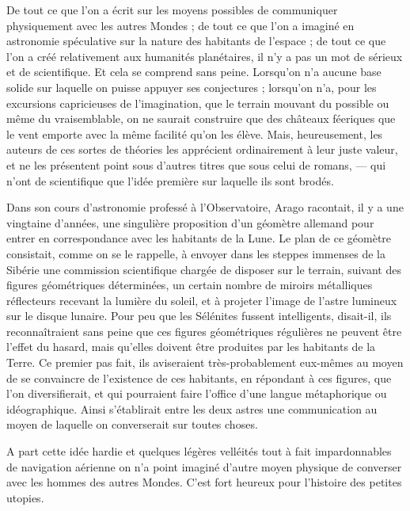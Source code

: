 \documentclass[a4paper, 11pt, oneside]{article}
\begin{document}
De tout ce que l'on a écrit sur les moyens possibles de communiquer physiquement avec les autres Mondes ; de tout ce que l'on a imaginé en astronomie spéculative sur la nature des habitants de l'espace ; de tout ce que l'on a créé relativement aux humanités planétaires, il n'y a pas un mot de sérieux et de scientifique. Et cela se comprend sans peine. Lorsqu'on n'a aucune base solide sur laquelle on puisse appuyer ses conjectures ; lorsqu'on n'a, pour les excursions capricieuses de l'imagination, que le terrain mouvant du possible ou même du vraisemblable, on ne saurait construire que des châteaux féeriques que le vent emporte avec la même facilité qu'on les élève. Mais, heureusement, les auteurs de ces sortes de théories les apprécient ordinairement à leur juste valeur, et ne les présentent point sous d'autres titres que sous celui de romans, --- qui n'ont de scientifique que l'idée première sur laquelle ils sont brodés.

Dans son cours d'astronomie professé à l'Observatoire, Arago racontait, il y a une vingtaine d'années, une singulière proposition d'un géomètre allemand pour entrer en correspondance avec les habitants de la Lune. Le plan de ce géomètre consistait, comme on se le rappelle, à envoyer dans les steppes immenses de la Sibérie une commission scientifique chargée de disposer sur le terrain, suivant des figures géométriques déterminées, un certain nombre de miroirs métalliques réflecteurs recevant la lumière du soleil, et à projeter l'image de l'astre lumineux sur le disque lunaire. Pour peu que les Sélénites fussent intelligents, disait-il, ils reconnaîtraient sans peine que ces figures géométriques régulières ne peuvent être l'effet du hasard, mais qu'elles doivent être produites par les habitants de la Terre. Ce premier pas fait, ils aviseraient très-probablement eux-mêmes au moyen de se convaincre de l'existence de ces habitants, en répondant à ces figures, que l'on diversifierait, et qui pourraient faire l'office d'une langue métaphorique ou idéographique. Ainsi s'établirait entre les deux astres une communication au moyen de laquelle on converserait sur toutes choses.

A part cette idée hardie et quelques légères velléités tout à fait impardonnables de navigation aérienne on n'a point imaginé d'autre moyen physique de converser avec les hommes des autres Mondes. C'est fort heureux pour l'histoire des petites utopies.
\end{document}
